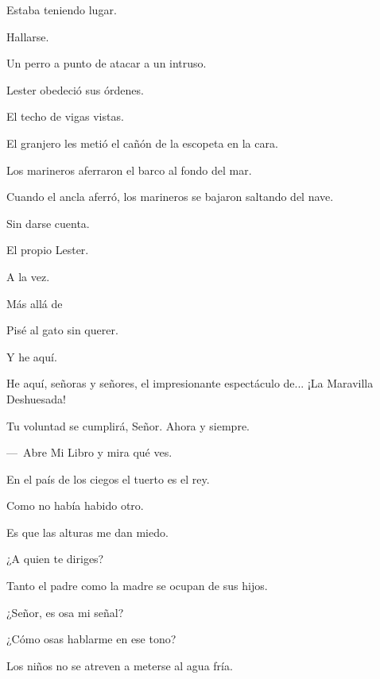 \sk
Estaba teniendo lugar. 

\sk
Hallarse. 

\sk
Un perro a punto de atacar a un intruso.

\sk
Lester obedeció sus órdenes.

\sk
El techo de vigas vistas.

\sk
El granjero les metió el cañón de la escopeta en la cara. 

\sk
Los marineros aferraron el barco al fondo del mar. 

\sk
Cuando el ancla aferró, los marineros se bajaron saltando del nave. 

\sk
Sin darse cuenta. 

\sk
El propio Lester. 

\sk
A la vez. 

\sk
Más allá de 

\sk
Pisé al gato sin querer. 

\sk
Y he aquí. 

\sk
He aquí, señoras y señores, el impresionante espectáculo de... ¡La Maravilla Deshuesada! 

\sk
Tu voluntad se cumplirá, Señor. Ahora y siempre.

\sk
---~Abre Mi Libro y mira qué ves. 

\sk
En el país de los ciegos el tuerto es el rey.

\sk
Como no había habido otro. 

\sk
Es que las alturas me dan miedo. 

\sk
¿A quien te diriges? 

\sk
Tanto el padre como la madre se ocupan de sus hijos. 

\sk
¿Señor, es osa mi señal? \nb{}

\sk
¿Cómo osas hablarme en ese tono? 

\sk
Los niños no se atreven a meterse al agua fría. 

